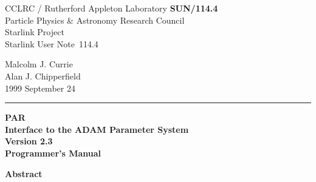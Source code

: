 \documentclass[twoside,11pt]{article}
\newcommand{\stardoccategory}  {Starlink User Note}
\newcommand{\stardocinitials}  {SUN}
\newcommand{\stardocnumber}    {114.4}
\newcommand{\stardocauthors}   {Malcolm J. Currie\\
                                Alan J. Chipperfield}
\newcommand{\stardocdate}      {1999 September 24}
\newcommand{\stardoctitle}     {PAR \\ [\latex{1ex}]
                                Interface to the ADAM
                                Parameter System}
\newcommand{\stardocversion}   {Version 2.3}
\newcommand{\stardocmanual}    {Programmer's Manual}
\newcommand{\stardocname}{\stardocinitials /\stardocnumber}
\newenvironment{latexonly}{}{}
\newcommand{\latex}[1]{#1}
\begin{document}
\thispagestyle{empty}

\begin{latexonly}
   CCLRC / {\sc Rutherford Appleton Laboratory} \hfill {\bf \stardocname}\\
   {\large Particle Physics \& Astronomy Research Council}\\
   {\large Starlink Project\\}
   {\large \stardoccategory\ \stardocnumber}
   \begin{flushright}
   \stardocauthors\\
   \stardocdate
   \end{flushright}
   \vspace{-4mm}
   \rule{\textwidth}{0.5mm}
   \vspace{5mm}
   \begin{center}
   {\Huge\bf  \stardoctitle \\ [2.5ex]}
   {\LARGE\bf \stardocversion \\ [4ex]}
   {\Huge\bf  \stardocmanual}
   \end{center}
   \vspace{5mm}


   \vspace{10mm}
   \begin{center}
      {\Large\bf Abstract}
   \end{center}
\end{latexonly}
\end{document}
